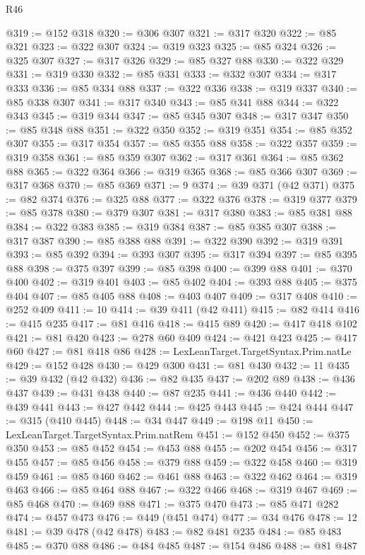 \begin{lexlean}{R46}
\begin{coremodule}
@319 := @152 @318
@320 := @306 @307
@321 := @317 @320
@322 := @85 @321
@323 := @322 @307
@324 := @319 @323
@325 := @85 @324
@326 := @325 @307
@327 := @317 @326
@329 := @85 @327 @88
@330 := @322 @329
@331 := @319 @330
@332 := @85 @331
@333 := @332 @307
@334 := @317 @333
@336 := @85 @334 @88
@337 := @322 @336
@338 := @319 @337
@340 := @85 @338 @307
@341 := @317 @340
@343 := @85 @341 @88
@344 := @322 @343
@345 := @319 @344
@347 := @85 @345 @307
@348 := @317 @347
@350 := @85 @348 @88
@351 := @322 @350
@352 := @319 @351
@354 := @85 @352 @307
@355 := @317 @354
@357 := @85 @355 @88
@358 := @322 @357
@359 := @319 @358
@361 := @85 @359 @307
@362 := @317 @361
@364 := @85 @362 @88
@365 := @322 @364
@366 := @319 @365
@368 := @85 @366 @307
@369 := @317 @368
@370 := @85 @369
@371 := 9
@374 := @39 @371 (@42 @371)
@375 := @82 @374
@376 := @325 @88
@377 := @322 @376
@378 := @319 @377
@379 := @85 @378
@380 := @379 @307
@381 := @317 @380
@383 := @85 @381 @88
@384 := @322 @383
@385 := @319 @384
@387 := @85 @385 @307
@388 := @317 @387
@390 := @85 @388 @88
@391 := @322 @390
@392 := @319 @391
@393 := @85 @392
@394 := @393 @307
@395 := @317 @394
@397 := @85 @395 @88
@398 := @375 @397
@399 := @85 @398
@400 := @399 @88
@401 := @370 @400
@402 := @319 @401
@403 := @85 @402
@404 := @393 @88
@405 := @375 @404
@407 := @85 @405 @88
@408 := @403 @407
@409 := @317 @408
@410 := @252 @409
@411 := 10
@414 := @39 @411 (@42 @411)
@415 := @82 @414
@416 := @415 @235
@417 := @81 @416
@418 := @415 @89
@420 := @417 @418 @102
@421 := @81 @420
@423 := @278 @60 @409
@424 := @421 @423
@425 := @417 @60
@427 := @81 @418 @86
@428 := LexLeanTarget.TargetSyntax.Prim.natLe
@429 := @152 @428
@430 := @429 @300
@431 := @81 @430
@432 := 11
@435 := @39 @432 (@42 @432)
@436 := @82 @435
@437 := @202 @89
@438 := @436 @437
@439 := @431 @438
@440 := @87 @235
@441 := @436 @440
@442 := @439 @441
@443 := @427 @442
@444 := @425 @443
@445 := @424 @444
@447 := @315 (@410 @445)
@448 := @34 @447
@449 := @198 @11
@450 := LexLeanTarget.TargetSyntax.Prim.natRem
@451 := @152 @450
@452 := @375 @350
@453 := @85 @452
@454 := @453 @88
@455 := @202 @454
@456 := @317 @455
@457 := @85 @456
@458 := @379 @88
@459 := @322 @458
@460 := @319 @459
@461 := @85 @460
@462 := @461 @88
@463 := @322 @462
@464 := @319 @463
@466 := @85 @464 @88
@467 := @322 @466
@468 := @319 @467
@469 := @85 @468
@470 := @469 @88
@471 := @375 @470
@473 := @85 @471 @282
@474 := @457 @473
@476 := @449 (@451 @474)
@477 := @34 @476
@478 := 12
@481 := @39 @478 (@42 @478)
@483 := @82 @481 @235
@484 := @85 @483
@485 := @370 @88
@486 := @484 @485
@487 := @154 @486
@488 := @81 @487

\end{coremodule}
\end{lexlean}
